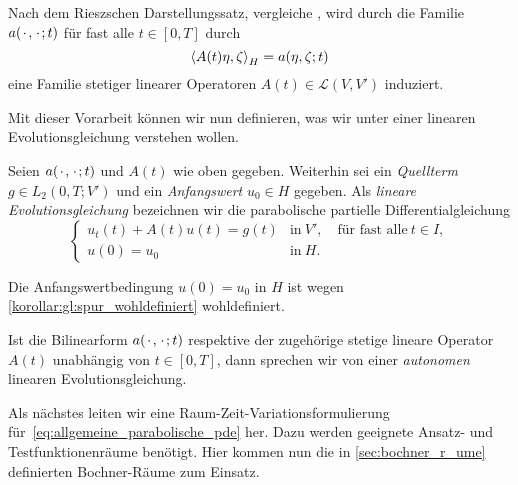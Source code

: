 Nach dem Rieszschen Darstellungssatz, vergleiche \cite[Theorem \S{}22.1]{Halmos:1957vd}, wird durch die Familie $a({\mkern2mu\cdot\mkern2mu}, {\mkern2mu\cdot\mkern2mu}; t)$ für fast alle $t \in [0, T]$ durch
\begin{equation}
    \left\langle A(t)\eta,\zeta\right\rangle_{H} = a(\eta, \zeta; t)
\end{equation}
eine Familie stetiger linearer Operatoren $A(t) \in \mathcal L(V, V')$ induziert.

Mit dieser Vorarbeit können wir nun definieren, was wir unter einer linearen Evolutionsgleichung verstehen wollen.

\begin{Definition}
\label{definition:lineare_evolutionsgleichung}
    Seien $a({\mkern2mu\cdot\mkern2mu}, {\mkern2mu\cdot\mkern2mu}; t)$ und $A(t)$ wie oben gegeben.
    Weiterhin sei ein \emph{Quellterm} $g \in L_{2}(0, T; V')$ und ein \emph{Anfangswert} $u_{0} \in H$ gegeben.
    Als \emph{lineare Evolutionsgleichung} bezeichnen wir die parabolische partielle Differentialgleichung
    \begin{equation}
        \label{eq:allgemeine_parabolische_pde}
        \begin{cases}
            u_{t}(t) + A(t) u(t) = g(t)     &\text{in}~V', \quad \text{für fast alle}~t \in I, \\
            u(0) = u_{0}                    &\text{in}~H.
        \end{cases}
    \end{equation}
\end{Definition}

\begin{Bemerkung}
\leavevmode
\begin{thmenumerate}
    \item Die Anfangswertbedingung $u(0) = u_{0}$ in $H$ ist wegen \cref{korollar:gl:spur_wohldefiniert} wohldefiniert.
    \item Ist die Bilinearform $a({\mkern2mu\cdot\mkern2mu}, {\mkern2mu\cdot\mkern2mu}; t)$ respektive der zugehörige stetige lineare Operator $A(t)$ unabhängig von $t \in [0, T]$, dann sprechen wir von einer \emph{autonomen} linearen Evolutionsgleichung.
\end{thmenumerate}
\end{Bemerkung}

Als nächstes leiten wir eine Raum-Zeit-Variationsformulierung für~\cref{eq:allgemeine_parabolische_pde} her.
Dazu werden geeignete Ansatz- und Testfunktionenräume benötigt.
Hier kommen nun die in \cref{sec:bochner_r_ume} definierten Bochner-Räume zum Einsatz.

